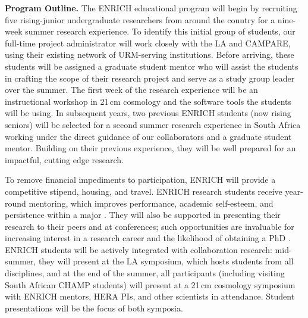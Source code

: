 \documentclass[preprint,11pt]{aastex}
\begin{document}
\textbf{Program Outline.} The ENRICH educational program will begin by recruiting five rising-junior undergraduate researchers from around the country for a nine-week summer research experience.  To identify this initial group of students, our full-time project administrator will work closely with the LA and CAMPARE, using their existing network of URM-serving institutions.  Before arriving, these students will be assigned a graduate student mentor who will assist the students in crafting the scope of their research project and serve as a study group leader over the summer.  The first week of the research experience will be an instructional workshop in 21\,cm cosmology and the software tools the students will be using.  In subsequent years, two previous ENRICH students (now rising seniors) will be selected for a second summer research experience in South Africa working under the direct guidance of our collaborators and a graduate student mentor.  Building on their previous experience,
they will be well prepared for an impactful, cutting edge research.

To remove financial impediments to participation, ENRICH will provide a competitive stipend, housing, and travel.  
ENRICH research students receive year-round mentoring, 
which improves performance, academic self-esteem, and persistence within a major \citep{cross_and_vick_2001,armstrong_and_thompson_2003}. They will also be supported in presenting their research to their peers and at conferences; such opportunities are invaluable for increasing interest in a research career and the likelihood of obtaining a PhD \citep{nsf_report_2006}.
ENRICH students will be actively integrated with collaboration research: mid-summer, they will present 
at the LA symposium, which hosts students from all disciplines, and  at the end of the summer, all participants (including visiting South African CHAMP students) will present 
at a 21\,cm cosmology symposium with ENRICH mentors, HERA PIs, and other scientists in attendance.  Student presentations will be the focus of both symposia.
\end{document}

